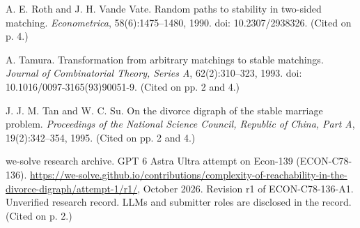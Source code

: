 \documentclass[11pt,letterpaper]{article}
\theoremstyle{definition}
\begin{document}
\begin{list}{}{\setlength{\leftmargin}{1em}\setlength{\itemindent}{-1em}\setlength{\itemsep}{.75em}\setlength{\parsep}{0pt}}
\item A. E. Roth and J. H. Vande Vate. Random paths to stability in two-sided matching. \emph{Econometrica}, 58(6):1475--1480, 1990. doi: 10.2307/2938326. (Cited on p. 4.)

\item A. Tamura. Transformation from arbitrary matchings to stable matchings. \emph{Journal of Combinatorial Theory, Series A}, 62(2):310--323, 1993. doi: 10.1016/0097-3165(93)90051-9. (Cited on pp. 2 and 4.)

\item J. J. M. Tan and W. C. Su. On the divorce digraph of the stable marriage problem. \emph{Proceedings of the National Science Council, Republic of China, Part A}, 19(2):342--354, 1995. (Cited on pp. 2 and 4.)

\item we-solve research archive. GPT 6 Astra Ultra attempt on Econ-139 (ECON-C78-136). \url{https://we-solve.github.io/contributions/complexity-of-reachability-in-the-divorce-digraph/attempt-1/r1/}, October 2026. Revision r1 of ECON-C78-136-A1. Unverified research record. LLMs and submitter roles are disclosed in the record. (Cited on p. 2.)
\end{list}
\end{document}

